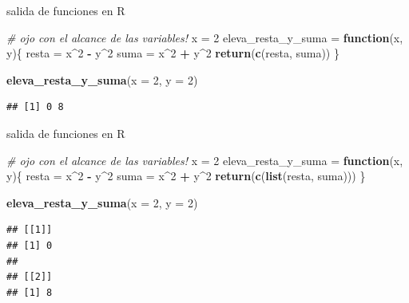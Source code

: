\documentclass[ignorenonframetext,]{beamer}
\newenvironment{Shaded}{\begin{snugshade}}{\end{snugshade}}
\newcommand{\CommentTok}[1]{\textcolor[rgb]{0.56,0.35,0.01}{\textit{#1}}}
\newcommand{\ControlFlowTok}[1]{\textcolor[rgb]{0.13,0.29,0.53}{\textbf{#1}}}
\newcommand{\DataTypeTok}[1]{\textcolor[rgb]{0.13,0.29,0.53}{#1}}
\newcommand{\DecValTok}[1]{\textcolor[rgb]{0.00,0.00,0.81}{#1}}
\newcommand{\KeywordTok}[1]{\textcolor[rgb]{0.13,0.29,0.53}{\textbf{#1}}}
\newcommand{\NormalTok}[1]{#1}
\newcommand{\OperatorTok}[1]{\textcolor[rgb]{0.81,0.36,0.00}{\textbf{#1}}}
\newcommand{\StringTok}[1]{\textcolor[rgb]{0.31,0.60,0.02}{#1}}
\begin{document}
\begin{frame}[fragile]{salida de funciones en R}
\protect\hypertarget{salida-de-funciones-en-r}{}

\begin{Shaded}
\begin{Highlighting}[]
\CommentTok{# ojo con el alcance de las variables!}
\NormalTok{x =}\StringTok{ }\DecValTok{2}
\NormalTok{eleva_resta_y_suma =}\StringTok{ }\ControlFlowTok{function}\NormalTok{(x, y)\{}
\NormalTok{  resta =}\StringTok{ }\NormalTok{x}\OperatorTok{^}\DecValTok{2} \OperatorTok{-}\StringTok{ }\NormalTok{y}\OperatorTok{^}\DecValTok{2}
\NormalTok{  suma =}\StringTok{ }\NormalTok{x}\OperatorTok{^}\DecValTok{2} \OperatorTok{+}\StringTok{ }\NormalTok{y}\OperatorTok{^}\DecValTok{2}
  \KeywordTok{return}\NormalTok{(}\KeywordTok{c}\NormalTok{(resta, suma))}
\NormalTok{\}}

\KeywordTok{eleva_resta_y_suma}\NormalTok{(}\DataTypeTok{x =} \DecValTok{2}\NormalTok{, }\DataTypeTok{y =} \DecValTok{2}\NormalTok{)}
\end{Highlighting}
\end{Shaded}

\begin{verbatim}
## [1] 0 8
\end{verbatim}

\end{frame}

\begin{frame}[fragile]{salida de funciones en R}
\protect\hypertarget{salida-de-funciones-en-r-1}{}

\begin{Shaded}
\begin{Highlighting}[]
\CommentTok{# ojo con el alcance de las variables!}
\NormalTok{x =}\StringTok{ }\DecValTok{2}
\NormalTok{eleva_resta_y_suma =}\StringTok{ }\ControlFlowTok{function}\NormalTok{(x, y)\{}
\NormalTok{  resta =}\StringTok{ }\NormalTok{x}\OperatorTok{^}\DecValTok{2} \OperatorTok{-}\StringTok{ }\NormalTok{y}\OperatorTok{^}\DecValTok{2}
\NormalTok{  suma =}\StringTok{ }\NormalTok{x}\OperatorTok{^}\DecValTok{2} \OperatorTok{+}\StringTok{ }\NormalTok{y}\OperatorTok{^}\DecValTok{2}
  \KeywordTok{return}\NormalTok{(}\KeywordTok{c}\NormalTok{(}\KeywordTok{list}\NormalTok{(resta, suma)))}
\NormalTok{\}}

\KeywordTok{eleva_resta_y_suma}\NormalTok{(}\DataTypeTok{x =} \DecValTok{2}\NormalTok{, }\DataTypeTok{y =} \DecValTok{2}\NormalTok{)}
\end{Highlighting}
\end{Shaded}

\begin{verbatim}
## [[1]]
## [1] 0
## 
## [[2]]
## [1] 8
\end{verbatim}

\end{frame}
\end{document}
